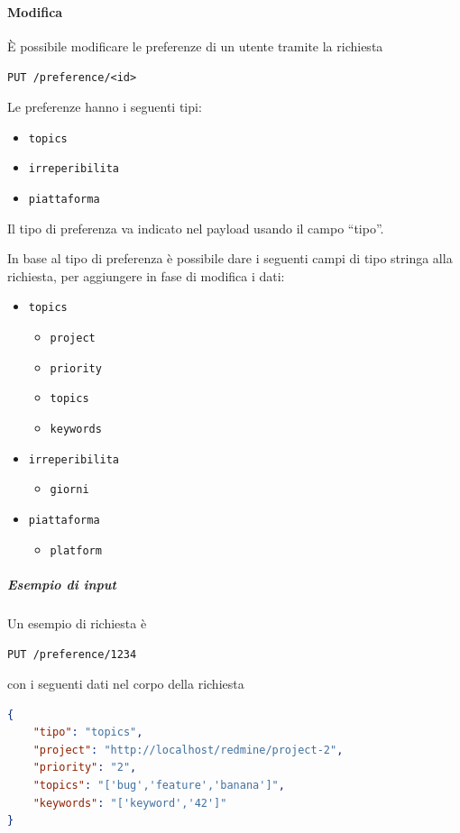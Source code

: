\paragraph{Modifica}

È possibile modificare le preferenze di un utente tramite la richiesta
\begin{center}
    \texttt{PUT /preference/<id>}
\end{center}

Le preferenze hanno i seguenti tipi:
\begin{itemize}[noitemsep]
    \item \texttt{topics}
    \item \texttt{irreperibilita}
    \item \texttt{piattaforma}
\end{itemize}

Il tipo di preferenza va indicato nel payload usando il campo ``tipo''.

In base al tipo di preferenza è possibile dare i seguenti campi di tipo stringa alla richiesta, per aggiungere in fase di modifica i dati:

\begin{itemize}[noitemsep]
    \item \texttt{topics}
    \begin{itemize}
        \item \texttt{project}
        \item \texttt{priority}
        \item \texttt{topics}
        \item \texttt{keywords}
    \end{itemize}
    \item \texttt{irreperibilita}
    \begin{itemize}
        \item \texttt{giorni}
    \end{itemize}
    \item \texttt{piattaforma}
    \begin{itemize}
        \item \texttt{platform}
    \end{itemize}
\end{itemize}

    \subparagraph{Esempio di input}
    Un esempio di richiesta è
    \begin{center}
	    \texttt{PUT /preference/1234}
    \end{center}
    con i seguenti dati nel corpo della richiesta
	\begin{lstlisting}[language = json]
{
    "tipo": "topics",
    "project": "http://localhost/redmine/project-2",
    "priority": "2",
    "topics": "['bug','feature','banana']",
    "keywords": "['keyword','42']"
}
    \end{lstlisting}


